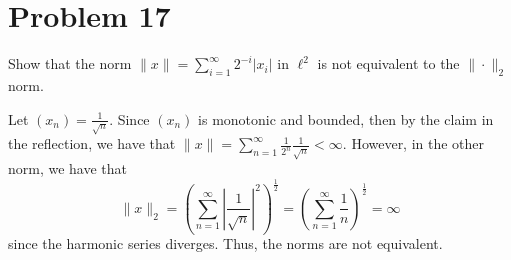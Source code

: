 \documentclass[11pt]{article}
\begin{document}
\section*{Problem 17}
\begin{problem}
    Show that the norm \( \|x\| = \sum_{i=1}^{\infty} 2^{-i} |x_i| \) in \( \ell^2 \) is not equivalent to the \( \|\cdot\|_2 \) norm.
\end{problem}
\begin{solution}
    Let $(x_n) = \frac{1}{\sqrt{n}}.$ Since $(x_n)$ is monotonic and bounded, then by the claim in the reflection, we have that $\|x\| = \sum_{n=1}^\infty \frac{1}{2^n}\frac{1}{\sqrt{n}} < \infty.$ However, in the other norm, we have that 
    \[\|x\|_2 = \left(\sum_{n=1}^\infty |\frac{1}{\sqrt{n}}|^2\right)^\frac{1}{2} =\left(\sum_{n=1}^\infty \frac1n\right)^\frac{1}{2} = \infty\] since the harmonic series diverges. Thus, the norms are not equivalent.
\end{solution}
\end{document}
